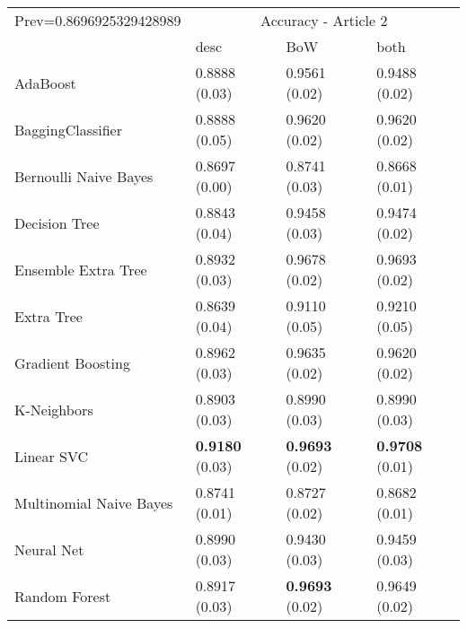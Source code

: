 \begin{tabular}{|l|l|l|l| }
\hline
Prev=0.8696925329428989 &  \multicolumn{3}{c|}{Accuracy - Article 2} \\
\cline{2-4} & desc & BoW & both \\ \hline
AdaBoost                & 0.8888 (0.03) & 0.9561 (0.02) & 0.9488 (0.02)\\
BaggingClassifier       & 0.8888 (0.05) & 0.9620 (0.02) & 0.9620 (0.02)\\
Bernoulli Naive Bayes   & 0.8697 (0.00) & 0.8741 (0.03) & 0.8668 (0.01)\\
Decision Tree           & 0.8843 (0.04) & 0.9458 (0.03) & 0.9474 (0.02)\\
Ensemble Extra Tree     & 0.8932 (0.03) & 0.9678 (0.02) & 0.9693 (0.02)\\
Extra Tree              & 0.8639 (0.04) & 0.9110 (0.05) & 0.9210 (0.05)\\
Gradient Boosting       & 0.8962 (0.03) & 0.9635 (0.02) & 0.9620 (0.02)\\
K-Neighbors             & 0.8903 (0.03) & 0.8990 (0.03) & 0.8990 (0.03)\\
Linear SVC              & {\bf 0.9180} (0.03) & {\bf 0.9693} (0.02) & {\bf 0.9708} (0.01)\\
Multinomial Naive Bayes & 0.8741 (0.01) & 0.8727 (0.02) & 0.8682 (0.01)\\
Neural Net              & 0.8990 (0.03) & 0.9430 (0.03) & 0.9459 (0.03)\\
Random Forest           & 0.8917 (0.03) & {\bf 0.9693} (0.02) & 0.9649 (0.02)\\
\hline
\end{tabular}